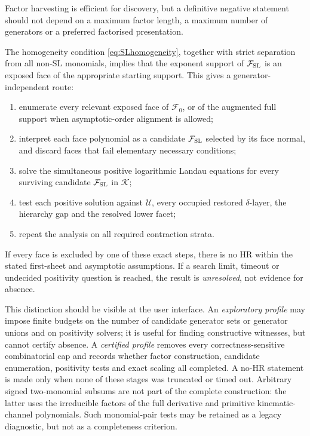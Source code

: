 \documentclass[a4paper,11pt]{article}
\newcommand{\K}{\mathcal K}
\newcommand{\FSL}{\mathcal F_{\rm SL}}
\begin{document}
Factor harvesting is efficient for discovery, but a definitive negative
statement should not depend on a maximum factor length, a maximum number of
generators or a preferred factorised presentation.

The homogeneity condition \eqref{eq:SLhomogeneity}, together with strict
separation from all non-SL monomials, implies that the exponent support of
\(\FSL\) is an exposed face of the appropriate starting support.  This gives
a generator-independent route:
\begin{enumerate}[label=\arabic*.]
\item enumerate every relevant exposed face of \(\mathcal F_0\), or of the
      augmented full support when asymptotic-order alignment is allowed;
\item interpret each face polynomial as a candidate \(\FSL\) selected by
      its face normal, and discard faces that fail elementary necessary
      conditions;
\item solve the simultaneous positive logarithmic Landau equations for every
      surviving candidate \(\FSL\) in \(\K\);
\item test each positive solution against \(\mathcal U\), every occupied
      restored \(\delta\)-layer, the hierarchy gap and the resolved lower
      facet;
\item repeat the analysis on all required contraction strata.
\end{enumerate}

If every face is excluded by one of these exact steps, there is no HR within
the stated first-sheet and asymptotic assumptions.  If a search limit,
timeout or undecided positivity question is reached, the result is
\emph{unresolved}, not evidence for absence.

This distinction should be visible at the user interface.  An
\emph{exploratory profile} may impose finite budgets on the number of
candidate generator sets or generator unions and on positivity solvers; it
is useful for finding constructive witnesses, but cannot certify absence.  A
\emph{certified profile} removes every correctness-sensitive combinatorial
cap and records whether factor construction, candidate enumeration,
positivity tests and exact scaling all completed.  A no-HR statement is made
only when none of these stages was truncated or timed out.  Arbitrary signed
two-monomial subsums are not part of the complete construction: the latter
uses the irreducible factors of the full derivative and primitive
kinematic-channel polynomials.  Such monomial-pair tests may be retained as a
legacy diagnostic, but not as a completeness criterion.
\end{document}

